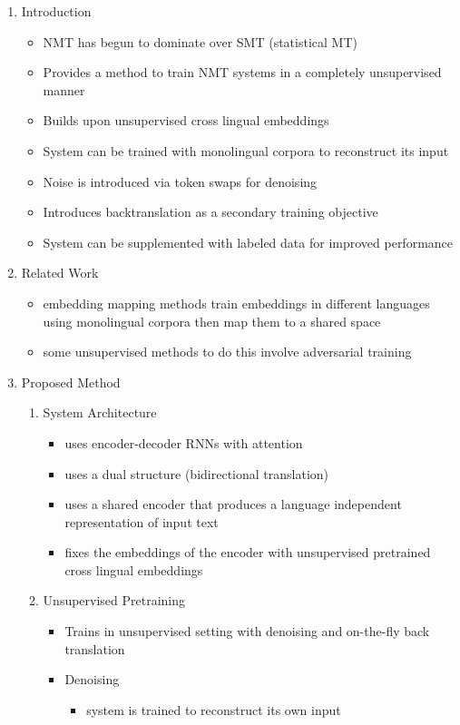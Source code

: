 \documentclass{article}
\begin{document}
\begin{enumerate}
	\item Introduction
	\begin{itemize}
		\item NMT has begun to dominate over SMT (statistical MT)
		\item Provides a method to train NMT systems in a completely unsupervised manner
		\item Builds upon unsupervised cross lingual embeddings
		\item System can be trained with monolingual corpora to reconstruct its input
		\item Noise is introduced via token swaps for denoising
		\item Introduces backtranslation as a secondary training objective
		\item System can be supplemented with labeled data for improved performance
	\end{itemize}
	\item Related Work
	\begin{itemize}
		\item embedding mapping methods train embeddings in different languages using monolingual corpora then map them to a shared space
		\item some unsupervised methods to do this involve adversarial training
	\end{itemize}
	\item Proposed Method
	\begin{enumerate}
		\item System Architecture
		\begin{itemize}
			\item uses encoder-decoder RNNs with attention
			\item uses a dual structure (bidirectional translation)
			\item uses a shared encoder that produces a language independent representation of input text
			\item fixes the embeddings of the encoder with unsupervised pretrained cross lingual embeddings
		\end{itemize}
		\item Unsupervised Pretraining
		\begin{itemize}
			\item Trains in unsupervised setting with denoising and on-the-fly back translation
			\item Denoising
			\begin{itemize}
				\item system is trained to reconstruct its own input

\end{itemize}
\end{itemize}
\end{enumerate}
\end{enumerate}
\end{document}
